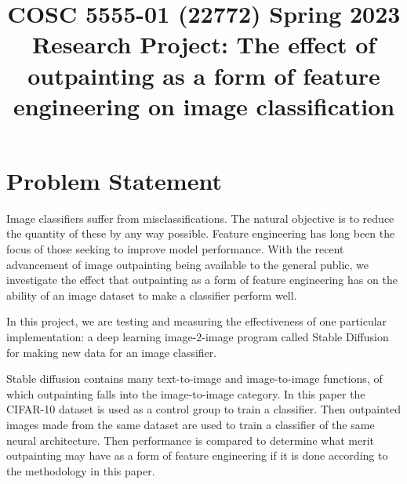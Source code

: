 \documentclass[conference]{IEEEtran}
\begin{document}
\title{COSC 5555-01 (22772) Spring 2023 Research Project: The effect of outpainting as a form of feature engineering on image classification}

\author{
\and
{}
}

\maketitle

\clearpage %

\section{Problem Statement}

Image classifiers suffer from misclassifications. The natural objective is to reduce the quantity of these by any way possible. Feature engineering has long been the focus of those seeking to improve model performance. With the recent advancement of image outpainting being available to the general public, we investigate the effect that outpainting as a form of feature engineering has on the
ability of an image dataset to make a classifier perform well.

In this project, we are testing and measuring the effectiveness of one particular implementation: a deep learning image-2-image program called Stable Diffusion for making new data for an image classifier.

Stable diffusion contains many text-to-image and image-to-image functions, of which outpainting falls into the image-to-image category. In this paper the CIFAR-10 dataset \cite{cifar} is used as a control group to train a classifier. Then outpainted images made from the same dataset are used to train a classifier of the same neural architecture. Then performance is compared to determine what merit outpainting may have as a form of feature engineering if it is done according to the methodology in this paper.
\end{document}
